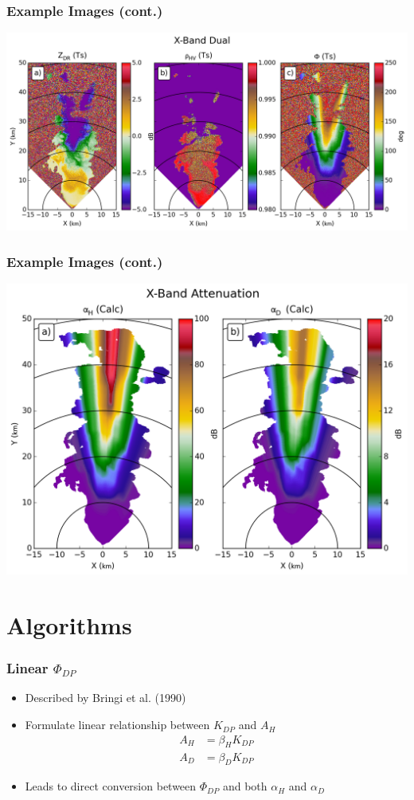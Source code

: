 \documentclass[red]{beamer}
\begin{document}
\begin{frame}
	\frametitle{Example Images (cont.)}
	\includegraphics[scale=0.4]{figures/X_Dual.png}
\end{frame}

\begin{frame}
	\frametitle{Example Images (cont.)}
	\begin{center}
		\includegraphics[scale=0.4]{figures/X_Attenuation.png}
	\end{center}
\end{frame}

\section{Algorithms}
\begin{frame}
	\frametitle{Linear $\Phi_{DP}$}
	\begin{itemize}
		\item Described by Bringi et al. (1990)
		\item Formulate linear relationship between $K_{DP}$ and $A_H$
		\begin{align*}
			A_H &= \beta_H K_{DP} \\
			A_D &= \beta_D K_{DP}
		\end{align*}
		\item Leads to direct conversion between $\Phi_{DP}$  and  both
				$\alpha_H$ and $\alpha_D$
	\end{itemize}
\end{frame}
\end{document}
